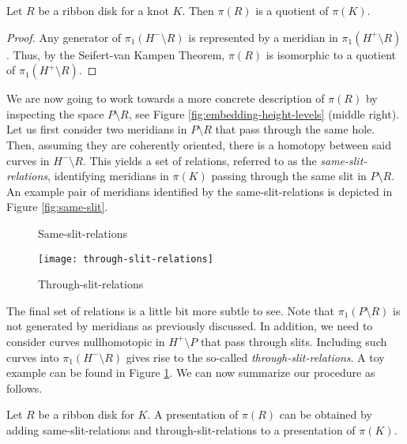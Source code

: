 \documentclass[main.tex]{subfiles}
\begin{document}
\begin{proposition}
Let $R$ be a ribbon disk for a knot $K$. Then $\pi(R)$ is a quotient of $\pi(K)$.
\end{proposition}

\begin{proof}
Any generator of $\pi_1(H^- \setminus R)$ is represented by a meridian in $\pi_1(H^+ \setminus R)$. Thus, by the Seifert-van Kampen Theorem, $\pi(R)$ is isomorphic to a quotient of $\pi_1(H^+ \setminus R)$.
\end{proof}

We are now going to work towards a more concrete description of $\pi(R)$ by inspecting the space $P \setminus R$, see Figure \ref{fig:embedding-height-levels} (middle right). Let us first consider two meridians in $P \setminus R$ that pass through the same hole. Then, assuming they are coherently oriented, there is a homotopy between said curves in $H^- \setminus R$. This yields a set of relations, referred to as the \textit{same-slit-relations}, identifying meridians in $\pi(K)$ passing through the same slit in $P \setminus R$. An example pair of meridians identified by the same-slit-relations is depicted in Figure \ref{fig:same-slit}.

\begin{figure}[htb]
\centering
\begin{minipage}[b]{0.5\textwidth}
\centering
{}
\caption{Same-slit-relations}
\label{fig:same-slit}
\end{minipage}%
\begin{minipage}[b]{0.5\textwidth}
\centering
\texttt{[image: through-slit-relations]}
\caption{Through-slit-relations}
\label{fig:an-interesting-curve}
\end{minipage}
\end{figure}

The final set of relations is a little bit more subtle to see. Note that $\pi_1(P \setminus R)$ is not generated by meridians as previously discussed. In addition, we need to consider curves nullhomotopic in $H^+ \setminus P$ that pass through slits. Including such curves into $\pi_1(H^- \setminus R)$ gives rise to the so-called \textit{through-slit-relations}. A toy example can be found in Figure \ref{fig:an-interesting-curve}. We can now summarize our procedure as follows.

\begin{lemma}
Let $R$ be a ribbon disk for $K$.
A presentation of $\pi(R)$ can be obtained by adding same-slit-relations and through-slit-relations to a presentation of $\pi(K)$.
\end{lemma}
\end{document}
